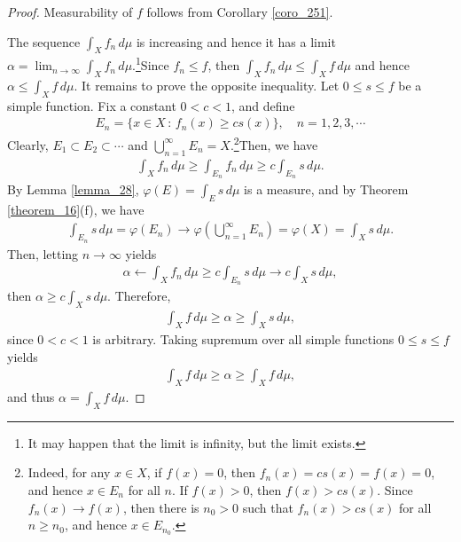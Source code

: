 \documentclass[11pt]{book}
\theoremstyle{definition}
\numberwithin{equation}{chapter}
\begin{document}
\begin{proof}
Measurability of $f$ follows from Corollary \ref{coro_251}.

The sequence $\int_X f_n\,d\mu$ is increasing and hence it has a limit $\alpha = \lim_{n\to\infty} \int_X f_n\,d\mu$.\footnote{It may happen that the limit is infinity, but the limit exists.}Since $f_n \leq f$, then $\int_X f_n\,d\mu \leq \int_X f\,d\mu$ and hence $\alpha \leq \int_X f\,d\mu$. It remains to prove the opposite inequality. 
Let $0 \leq s \leq f$ be a simple function. Fix a constant $0 < c < 1$, and define
\begin{align*}
    E_n = \{x \in X \,:\, f_n(x) \geq cs(x)\}, \quad n = 1,2,3,\cdots
\end{align*}
Clearly, $E_1 \subset E_2 \subset \cdots$ and $\bigcup^\infty_{n=1} E_n = X$.\footnote{Indeed, for any $x \in X$, if $f(x) = 0$, then $f_n(x) = cs(x) = f(x) = 0$, and hence $x \in E_n$ for all $n$. If $f(x) > 0$, then $f(x) > cs(x)$. Since $f_n(x) \to f(x)$, then there is $n_0 > 0$ such that $f_n(x) > cs(x)$ for all $n \geq n_0$, and hence $x \in E_{n_0}$.}Then, we have
\begin{align*}
    \int_X f_n\,d\mu \geq \int_{E_n} f_n\,d\mu \geq c \int_{E_n} s\,d\mu.
\end{align*}
By Lemma \ref{lemma_28}, $\varphi(E) = \int_E s\, d\mu$ is a measure, and by Theorem \ref{theorem_16}(f), we have
\begin{align*}
    \int_{E_n} s\,d\mu = \varphi(E_n) \to \varphi\left(\bigcup^\infty_{n=1} E_n\right) = \varphi(X) = \int_X s\,d\mu.
\end{align*}
Then, letting $n \to \infty$ yields
\begin{align*}
    \alpha \leftarrow \int_X f_n\,d\mu \geq c \int_{E_n} s\,d\mu \to c\int_X s\,d\mu,
\end{align*}
then $\alpha \geq c\int_X s\,d\mu$. Therefore,
\begin{align*}
    \int_X f\,d\mu \geq \alpha \geq \int_X s\,d\mu,
\end{align*}
since $0 < c < 1$ is arbitrary. Taking supremum over all simple functions $0 \leq s \leq f$  yields
\begin{align*}
    \int_X f\,d\mu \geq \alpha \geq \int_X f\,d\mu,
\end{align*}
and thus $\alpha = \int_X f\,d\mu$.
\end{proof}

\medskip
\end{document}
